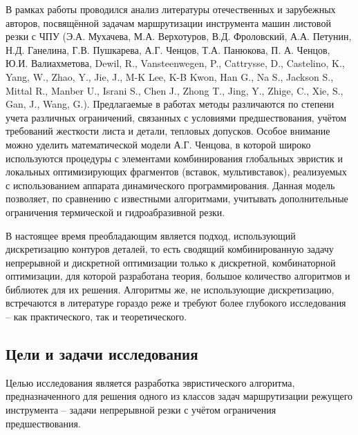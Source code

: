 \documentclass[14pt]{extarticle}
\theoremstyle{plain}%
\theoremstyle{remark}
\begin{document}
В рамках работы проводился анализ литературы отечественных и
зарубежных авторов,
посвящённой задачам маршрутизации инструмента машин
листовой резки с ЧПУ
(Э.А. Мухачева, М.А. Верхотуров, В.Д. Фроловский, А.А.
Петунин, Н.Д. Ганелина, Г.В. Пушкарева, А.Г. Ченцов, Т.А. Панюкова, П. А.
Ченцов, Ю.И. Валиахметова,
Dewil, R., Vansteenwegen, P., Cattrysse, D.,
Castelino, K.,
Yang, W., Zhao, Y., Jie, J., M-K Lee, K-B Kwon, Han G.,
Na S., Jackson S., Mittal R., Manber U., Israni S., Chen J., Zhong T., Jing, Y.,
Zhige, C., Xie, S., Gan, J., Wang, G.).
Предлагаемые в работах методы
различаются по степени учета различных ограничений, связанных с условиями
предшествования,
учётом требований жесткости листа и детали, тепловых
допусков.
Особое внимание можно уделить математической модели А.Г. Ченцова,
в которой широко используются процедуры с элементами комбинирования
глобальных эвристик и локальных оптимизирующих фрагментов (вставок,
мультивставок),
реализуемых с использованием
аппарата динамического программирования.
Данная модель позволяет, по сравнению с известными
алгоритмами, учитывать дополнительные ограничения термической
и гидроабразивной резки.

В настоящее время преобладающим является подход,
использующий дискретизацию контуров деталей,
то есть сводящий комбинированную задачу
непрерывной и дискретной оптимизации
только к дискретной,
комбинаторной оптимизации,
для которой разработана теория,
большое количество алгоритмов
и библиотек для их решения.
Алгоритмы же,
не использующие дискретизацию,
встречаются в литературе
гораздо реже
и требуют более глубокого исследования --
как практического,
так и теоретического.

\subsection*{Цели и задачи исследования}

Целью исследования является разработка
эвристического алгоритма,
предназначенного для решения
одного из классов задач маршрутизации
режущего инструмента --
задачи непрерывной резки
с учётом ограничения предшествования.
\end{document}
